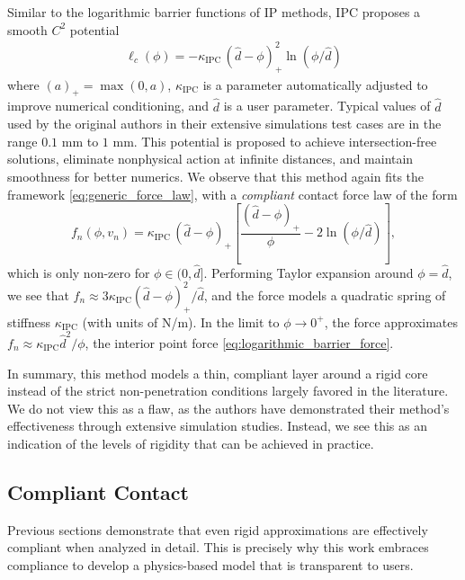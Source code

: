 Similar to the logarithmic barrier functions of IP methods, IPC proposes a
smooth $C^2$ potential
\begin{eqnarray*}
    \ell_c(\phi) = -\kappa_\text{IPC}\,(\hat{d}-\phi)_+^2\ln(\phi/\hat{d})
\end{eqnarray*}
where $(a)_+ = \max(0, a)$, $\kappa_\text{IPC}$ is a parameter automatically
adjusted to improve numerical conditioning, and $\hat{d}$ is a user parameter.
Typical values of $\hat{d}$ used by the original authors in their extensive
simulations test cases are in the range $0.1\text{ mm}$ to $1\text{ mm}$. This
potential is proposed to achieve intersection-free solutions, eliminate
nonphysical action at infinite distances, and maintain smoothness for better
numerics. We observe that this method again fits the framework
\eqref{eq:generic_force_law}, with a \emph{compliant} contact force law of the
form
\begin{equation*}
    f_n(\phi, v_n) = \kappa_\text{IPC}\,(\hat{d}-\phi)_+\left[\frac{(\hat{d}-\phi)_+}{\phi} - 2\ln(\phi/\hat{d})\right],
\end{equation*}
which is only non-zero for $\phi\in(0, \hat{d}]$. Performing Taylor expansion around
$\phi=\hat{d}$, we see that $f_n\approx
3\kappa_\text{IPC}(\hat{d}-\phi)_+^2/\hat{d}$, and the force models a quadratic spring of
stiffness $\kappa_\text{IPC}$ (with units of N/m). In the limit to
$\phi\rightarrow 0^+$, the force approximates
$f_n\approx\kappa_\text{IPC}\hat{d}^2/\phi$, the interior point force
\eqref{eq:logarithmic_barrier_force}.

In summary, this method models a thin, compliant layer around a rigid core
instead of the strict non-penetration conditions largely favored in the
literature. We do not view this as a flaw, as the authors have demonstrated their method's
effectiveness through extensive simulation studies. Instead, we see this as
an indication of the levels of rigidity that can be achieved in practice.

\subsection{Compliant Contact}

Previous sections demonstrate that even rigid approximations are effectively
compliant when analyzed in detail. This is precisely why this work embraces
compliance to develop a physics-based model that is transparent to users.

